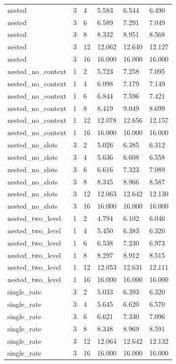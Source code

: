 \begin{tabular}{llllll}
nested & 3 & 4 & 5.583 & 6.544 & 6.490 \\
nested & 3 & 6 & 6.589 & 7.291 & 7.049 \\
nested & 3 & 8 & 8.332 & 8.951 & 8.568 \\
nested & 3 & 12 & 12.062 & 12.640 & 12.127 \\
nested & 3 & 16 & 16.000 & 16.000 & 16.000 \\
nested\_no\_context & 1 & 2 & 5.723 & 7.258 & 7.095 \\
nested\_no\_context & 1 & 4 & 6.098 & 7.179 & 7.149 \\
nested\_no\_context & 1 & 6 & 6.844 & 7.596 & 7.421 \\
nested\_no\_context & 1 & 8 & 8.419 & 9.049 & 8.699 \\
nested\_no\_context & 1 & 12 & 12.078 & 12.656 & 12.157 \\
nested\_no\_context & 1 & 16 & 16.000 & 16.000 & 16.000 \\
nested\_no\_slots & 3 & 2 & 5.026 & 6.385 & 6.312 \\
nested\_no\_slots & 3 & 4 & 5.636 & 6.608 & 6.558 \\
nested\_no\_slots & 3 & 6 & 6.616 & 7.323 & 7.089 \\
nested\_no\_slots & 3 & 8 & 8.345 & 8.966 & 8.587 \\
nested\_no\_slots & 3 & 12 & 12.063 & 12.642 & 12.130 \\
nested\_no\_slots & 3 & 16 & 16.000 & 16.000 & 16.000 \\
nested\_two\_level & 1 & 2 & 4.794 & 6.102 & 6.046 \\
nested\_two\_level & 1 & 4 & 5.450 & 6.383 & 6.320 \\
nested\_two\_level & 1 & 6 & 6.538 & 7.230 & 6.973 \\
nested\_two\_level & 1 & 8 & 8.297 & 8.912 & 8.515 \\
nested\_two\_level & 1 & 12 & 12.053 & 12.631 & 12.111 \\
nested\_two\_level & 1 & 16 & 16.000 & 16.000 & 16.000 \\
single\_rate & 3 & 2 & 5.033 & 6.393 & 6.320 \\
single\_rate & 3 & 4 & 5.645 & 6.620 & 6.570 \\
single\_rate & 3 & 6 & 6.621 & 7.330 & 7.096 \\
single\_rate & 3 & 8 & 8.348 & 8.969 & 8.591 \\
single\_rate & 3 & 12 & 12.064 & 12.642 & 12.132 \\
single\_rate & 3 & 16 & 16.000 & 16.000 & 16.000 \\
\hline
\end{tabular}
